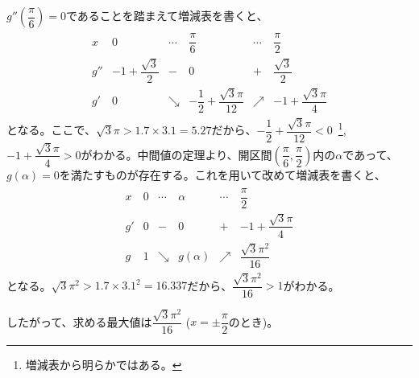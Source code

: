 $g''\left(\dfrac{\pi}{6}\right)=0$であることを踏まえて増減表を書くと、
\begin{align*}
 \begin{array}{c|c|c|c|c|c}
 x & 0 & \cdots & \dfrac{\pi}{6} & \cdots & \dfrac{\pi}{2} \\[1ex] \hline
 g'' & -1+\dfrac{\sqrt{3}}{2} & - & 0 & + & \dfrac{\sqrt{3}}{2} \\[1ex] \hline
 g' & 0 & \searrow & -\dfrac{1}{2}+\dfrac{\sqrt{3}\pi}{12} & \nearrow & -1+\dfrac{\sqrt{3}\pi}{4}
 \end{array}
\end{align*}
となる。ここで、$\sqrt{3}\pi>1.7\times3.1=5.27$だから、$-\dfrac{1}{2}+\dfrac{\sqrt{3}\pi}{12}<0$~\footnote{増減表から明らかではある。}, $-1+\dfrac{\sqrt{3}\pi}{4}>0$がわかる。中間値の定理より、開区間$\left(\dfrac{\pi}{6}, \dfrac{\pi}{2}\right)$内の$\alpha$であって、$g(\alpha)=0$を満たすものが存在する。これを用いて改めて増減表を書くと、
\begin{align*}
 \begin{array}{c|c|c|c|c|c}
 x & 0 & \cdots & \alpha & \cdots & \dfrac{\pi}{2} \\[1ex] \hline
 g' & 0 & - & 0 & + & -1+\dfrac{\sqrt{3}\pi}{4} \\[1ex] \hline
 g & 1 & \searrow & g(\alpha) & \nearrow & \dfrac{\sqrt{3}\pi^2}{16}
 \end{array}
\end{align*}
となる。$\sqrt{3}\pi^2>1.7\times3.1^2=16.337$だから、$\dfrac{\sqrt{3}\pi^2}{16}>1$がわかる。

したがって、求める最大値は$\dfrac{\sqrt{3}\pi^2}{16}$ ($x=\pm\dfrac{\pi}{2}$のとき)。

